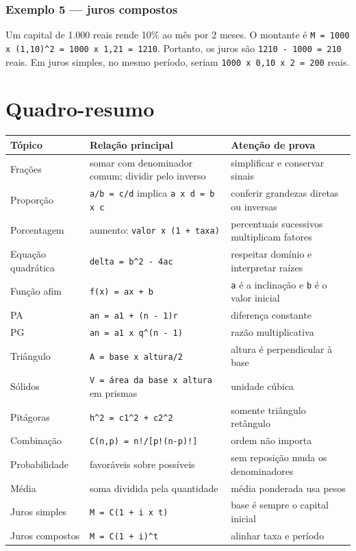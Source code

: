 \documentclass[11pt,a4paper]{article}
\begin{document}
\subsubsection*{Exemplo 5 — juros compostos}

Um capital de 1.000 reais rende 10\% ao mês por 2 meses. O montante é \texttt{M = 1000 x (1,10)\textasciicircum{}2 = 1000 x 1,21 = 1210}. Portanto, os juros são \texttt{1210 - 1000 = 210} reais. Em juros simples, no mesmo período, seriam \texttt{1000 x 0,10 x 2 = 200} reais.

\section*{Quadro-resumo}

\begin{tabularx}{\linewidth}{llX}
\toprule
 \textbf{Tópico} & \textbf{Relação principal} & \textbf{Atenção de prova} \\
\midrule
 Frações & somar com denominador comum; dividir pelo inverso & simplificar e conservar sinais \\
 Proporção & \texttt{a/b = c/d} implica \texttt{a x d = b x c} & conferir grandezas diretas ou inversas \\
 Porcentagem & aumento: \texttt{valor x (1 + taxa)} & percentuais sucessivos multiplicam fatores \\
 Equação quadrática & \texttt{delta = b\textasciicircum{}2 - 4ac} & respeitar domínio e interpretar raízes \\
 Função afim & \texttt{f(x) = ax + b} & \texttt{a} é a inclinação e \texttt{b} é o valor inicial \\
 PA & \texttt{an = a1 + (n - 1)r} & diferença constante \\
 PG & \texttt{an = a1 x q\textasciicircum{}(n - 1)} & razão multiplicativa \\
 Triângulo & \texttt{A = base x altura/2} & altura é perpendicular à base \\
 Sólidos & \texttt{V = área da base x altura} em prismas & unidade cúbica \\
 Pitágoras & \texttt{h\textasciicircum{}2 = c1\textasciicircum{}2 + c2\textasciicircum{}2} & somente triângulo retângulo \\
 Combinação & \texttt{C(n,p) = n!/[p!(n-p)!]} & ordem não importa \\
 Probabilidade & favoráveis sobre possíveis & sem reposição muda os denominadores \\
 Média & soma dividida pela quantidade & média ponderada usa pesos \\
 Juros simples & \texttt{M = C(1 + i x t)} & base é sempre o capital inicial \\
 Juros compostos & \texttt{M = C(1 + i)\textasciicircum{}t} & alinhar taxa e período \\
\bottomrule
\end{tabularx}
\end{document}
